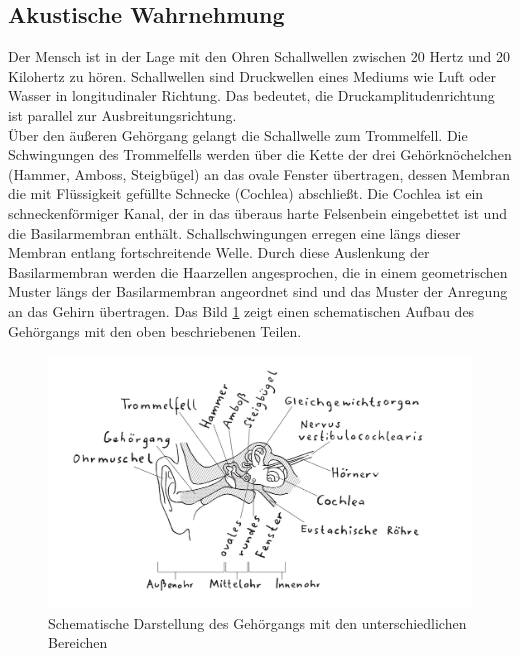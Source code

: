 \subsection{Akustische Wahrnehmung}
Der Mensch ist in der Lage mit den Ohren Schallwellen zwischen 20 Hertz und 20 Kilohertz zu hören. Schallwellen sind Druckwellen eines Mediums wie Luft oder Wasser in longitudinaler Richtung. Das bedeutet, die Druckamplitudenrichtung ist parallel zur Ausbreitungsrichtung. \cite[Vgl. Seite 217]{Schonhammer.2013} \\
\glqq Über den äußeren Gehörgang gelangt die Schallwelle zum Trommelfell. Die Schwingungen des Trommelfells werden über die Kette der drei Gehörknöchelchen (Hammer, Amboss, Steigbügel) an das ovale Fenster übertragen, dessen Membran die mit Flüssigkeit gefüllte Schnecke (Cochlea) abschließt. Die Cochlea ist ein schneckenförmiger Kanal, der in das überaus harte Felsenbein eingebettet ist und die Basilarmembran enthält. Schallschwingungen erregen eine längs dieser Membran entlang fortschreitende Welle. Durch diese Auslenkung der Basilarmembran werden die Haarzellen angesprochen, die in einem geometrischen Muster längs der Basilarmembran angeordnet sind und das Muster der Anregung an das Gehirn übertragen. \grqq{} \cite[Seite 71f.]{Bernstein.2019}
Das Bild \ref{fig:Ohr} zeigt einen schematischen Aufbau des Gehörgangs mit den oben beschriebenen Teilen.
\begin{figure}[hbt]
	\centering
	\includegraphics[width=0.7\linewidth]{images/Ohr}
	\caption[Schematische Darstellung des Gehörgangs mit den unterschiedlichen Bereichen]{Schematische Darstellung des Gehörgangs mit den unterschiedlichen Bereichen \cite[Seite 219]{Schonhammer.2013}}
	\label{fig:Ohr}
\end{figure}
